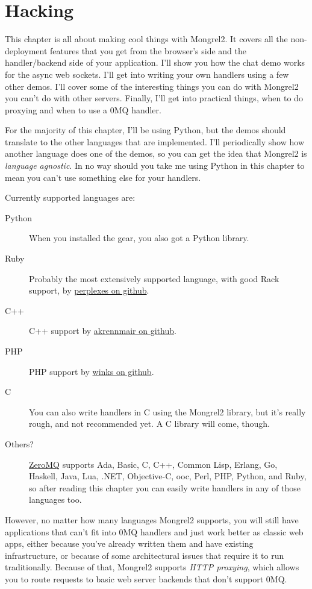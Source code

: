 \chapter{Hacking}

This chapter is all about making cool things with Mongrel2.  It covers all the non-deployment
features that you get from the browser's side and the handler/backend side of your application.
I'll show you how the chat demo works for the async web sockets.  I'll get into writing your
own handlers using a few other demos.  I'll cover some of the interesting things you can
do with Mongrel2 you can't do with other servers.  Finally, I'll get into practical things,
when to do proxying and when to use a 0MQ handler.

For the majority of this chapter, I'll be using Python, but the demos should translate to
the other languages that are implemented.  I'll periodically show how another language
does one of the demos, so you can get the idea that Mongrel2 is \emph{language agnostic}.
In no way should you take me using Python in this chapter to mean you can't use something
else for your handlers.

Currently supported languages are:

\begin{description}
\item [Python] When you installed the  gear, you also got a  Python library.
\item [Ruby] Probably the most extensively supported language, with good Rack support, by \href{http://github.com/perplexes/m2r}{perplexes on github}.
\item [C++] C++ support by \href{http://github.com/akrennmair/mongrel2-cpp}{akrennmair on github}.
\item [PHP] PHP support by \href{http://github.com/winks/m2php}{winks on github}.
\item [C] You can also write handlers in C using the Mongrel2 library, but it's really rough, and not recommended yet.  A C library will come, though.
\item [Others?] \href{http://zeromq.org}{ZeroMQ} supports Ada, Basic, C, C++, Common Lisp, Erlang, Go, Haskell, Java, Lua, .NET, Objective-C, ooc, Perl, PHP, Python, and Ruby, so after reading this chapter you can easily write handlers in any of those languages too.
\end{description}

However, no matter how many languages Mongrel2 supports, you will still have applications that
can't fit into 0MQ handlers and just work better as classic web apps, either because you've
already written them and have existing infrastructure, or because of some architectural issues
that require it to run traditionally.  Because of that, Mongrel2 supports \emph{HTTP proxying},
which allows you to route requests to basic web server backends that don't support 0MQ.

